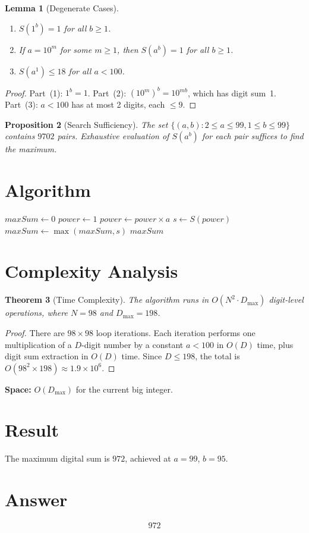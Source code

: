 \documentclass[12pt,a4paper]{article}
\newtheorem{theorem}{Theorem}
\newtheorem{lemma}[theorem]{Lemma}
\newtheorem{proposition}[theorem]{Proposition}
\theoremstyle{definition}
\theoremstyle{remark}
\begin{document}
\begin{lemma}[Degenerate Cases]
\leavevmode
\begin{enumerate}
    \item $S(1^b) = 1$ for all $b \geq 1$.
    \item If $a = 10^m$ for some $m \geq 1$, then $S(a^b) = 1$ for all $b \geq 1$.
    \item $S(a^1) \leq 18$ for all $a < 100$.
\end{enumerate}
\end{lemma}

\begin{proof}
Part~(1): $1^b = 1$. Part~(2): $(10^m)^b = 10^{mb}$, which has digit sum~1. Part~(3): $a < 100$ has at most 2 digits, each $\leq 9$.
\end{proof}

\begin{proposition}[Search Sufficiency]
The set $\{(a,b) : 2 \leq a \leq 99, 1 \leq b \leq 99\}$ contains $9702$ pairs. Exhaustive evaluation of $S(a^b)$ for each pair suffices to find the maximum.
\end{proposition}

\section{Algorithm}

\begin{algorithm}[H]
\caption{Find Maximum Digital Sum}
\begin{algorithmic}[1]
\State $\textit{maxSum} \gets 0$
    \State $\textit{power} \gets 1$
        \State $\textit{power} \gets \textit{power} \times a$
        \State $s \gets S(\textit{power})$
        \State $\textit{maxSum} \gets \max(\textit{maxSum}, s)$
    \EndFor
\EndFor
\State \Return $\textit{maxSum}$
\end{algorithmic}
\end{algorithm}

\section{Complexity Analysis}

\begin{theorem}[Time Complexity]
The algorithm runs in $O(N^2 \cdot D_{\max})$ digit-level operations, where $N = 98$ and $D_{\max} = 198$.
\end{theorem}

\begin{proof}
There are $98 \times 98$ loop iterations. Each iteration performs one multiplication of a $D$-digit number by a constant $a < 100$ in $O(D)$ time, plus digit sum extraction in $O(D)$ time. Since $D \leq 198$, the total is $O(98^2 \times 198) \approx 1.9 \times 10^6$.
\end{proof}

\noindent\textbf{Space:} $O(D_{\max})$ for the current big integer.

\section{Result}

The maximum digital sum is $\boxed{972}$, achieved at $a = 99$, $b = 95$.

\section{Answer}

\[
\boxed{972}
\]
\end{document}
